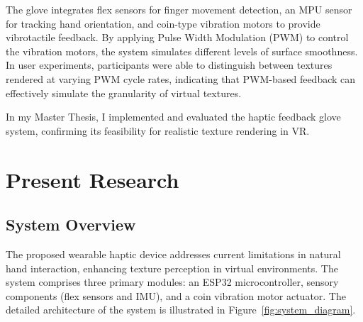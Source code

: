 \documentclass[graybox]{svmult}
\begin{document}
The glove integrates flex sensors for finger movement detection, an MPU sensor for tracking hand orientation, and coin-type vibration motors to provide vibrotactile feedback. By applying Pulse Width Modulation (PWM) to control the vibration motors, the system simulates different levels of surface smoothness. In user experiments, participants were able to distinguish between textures rendered at varying PWM cycle rates, indicating that PWM-based feedback can effectively simulate the granularity of virtual textures.

In my Master Thesis, I implemented and evaluated the haptic feedback glove system, confirming its feasibility for realistic texture rendering in VR.


\section{Present Research}\label{sec:Present Research}


\subsection{System Overview}
\label{sec:System Overview}
The proposed wearable haptic device addresses current limitations in natural hand interaction, enhancing texture perception in virtual environments. The system comprises three primary modules: an ESP32 microcontroller, sensory components (flex sensors and IMU), and a coin vibration motor actuator. The detailed architecture of the system is illustrated in Figure~\ref{fig:system_diagram}.
\end{document}
